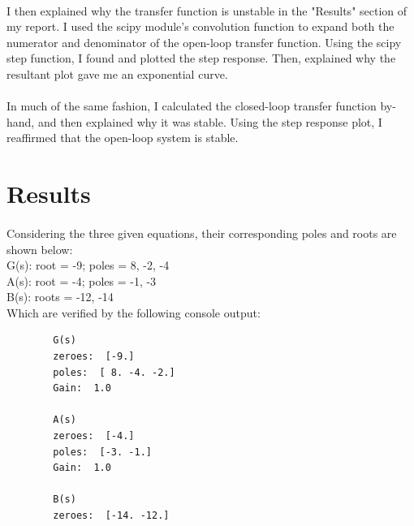 \documentclass[12pt]{report}
\begin{document}
    \paragraph{} I then explained why the transfer function is unstable in the "Results" section of my report. I used the scipy module's convolution function to expand both the numerator and denominator of the open-loop transfer function. Using the scipy step function, I found and plotted the step response. Then, explained why the resultant plot gave me an exponential curve. 
    
    \paragraph{} In much of the same fashion, I calculated the closed-loop transfer function by-hand, and then explained why it was stable. Using the step response plot, I reaffirmed that the open-loop system is stable. 
    
\section{Results}


    \paragraph{} Considering the three given equations, their corresponding poles and roots are shown below: \\
    G(s): root = -9; poles = 8, -2, -4 \\
    A(s): root = -4; poles = -1, -3 \\
    B(s): roots = -12, -14 \\
    
    Which are verified by the following console output: \\
    \begin{lstlisting}
        G(s)
        zeroes:  [-9.]
        poles:  [ 8. -4. -2.]
        Gain:  1.0

        A(s)
        zeroes:  [-4.]
        poles:  [-3. -1.]
        Gain:  1.0

        B(s)
        zeroes:  [-14. -12.]
    \end{lstlisting}
    
\end{document}
